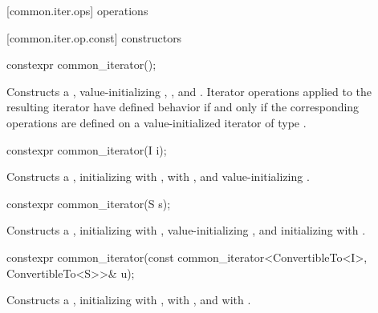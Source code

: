 [common.iter.ops]{ operations}

[common.iter.op.const]{ constructors}

%
\begin{itemdecl}
constexpr common_iterator();
\end{itemdecl}

\begin{itemdescr}
\pnum
\effects Constructs a , value-initializing
, , and . Iterator operations
applied to the resulting iterator have defined behavior if and only if the
corresponding operations are defined on a value-initialized iterator of type
.
\end{itemdescr}

%
\begin{itemdecl}
constexpr common_iterator(I i);
\end{itemdecl}

\begin{itemdescr}
\pnum
\effects Constructs a , initializing
 with ,  with , and
value-initializing .
\end{itemdescr}

%
\begin{itemdecl}
constexpr common_iterator(S s);
\end{itemdecl}

\begin{itemdescr}
\pnum
\effects Constructs a , initializing
 with , value-initializing , and
initializing  with .
\end{itemdescr}

%
\begin{itemdecl}
constexpr common_iterator(const common_iterator<ConvertibleTo<I>, ConvertibleTo<S>>& u);
\end{itemdecl}

\begin{itemdescr}
\pnum
\effects Constructs a , initializing 
with ,  with , and 
with .
\end{itemdescr}

